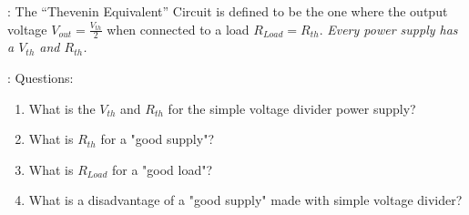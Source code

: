 \documentclass[handout]{beamer}
\begin{document}
\begin{frame}{\secname : \subsecname}
The ``Thevenin Equivalent'' Circuit is defined to be the one where the output voltage $V_{out}=\frac{V_{th}}{2}$  when connected to a load $R_{Load}=R_{th}$.  \emph{Every power supply has a $V_{th}$ and $R_{th}$.}
\begin{figure}
\end{figure}

\end{frame}


\begin{frame}{\secname : \subsecname}
Questions:

\begin{enumerate}
\item What is the $V_{th}$ and $R_{th}$ for the simple voltage divider power supply?  
\item What is $R_{th}$ for a "good supply"?
\item What is $R_{Load}$ for a "good load"?
\item What is a disadvantage of a "good supply" made with simple voltage divider?
\end{enumerate}

\vspace{0.5 cm}


\end{frame}
\end{document}
